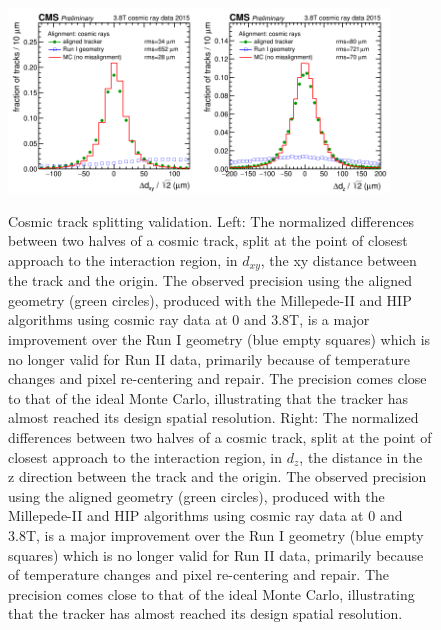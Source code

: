 \begin{figure}[htb]
    \begin{center}
        \includegraphics[width=0.45\textwidth]{../figs/Alignment/AlRes_CRAFT_hist_Delta_dxy.png}\includegraphics[width=0.45\textwidth]{../figs/Alignment/AlRes_CRAFT_hist_Delta_dz.png}
    \end{center}
    \caption{Cosmic track splitting validation. Left: The normalized differences between two halves of a cosmic track, split at the point of closest approach to the interaction region, in $d_{xy}$, the xy distance between the track and the origin. The observed precision using the aligned geometry (green circles), produced with the Millepede-II and HIP algorithms using cosmic ray data at 0 and 3.8T, is a major improvement over the Run I geometry (blue empty squares) which is no longer valid for Run II data, primarily because of temperature changes and pixel re-centering and repair. The precision comes close to that of the ideal Monte Carlo, illustrating that the tracker has almost reached its design spatial resolution. Right: The normalized differences between two halves of a cosmic track, split at the point of closest approach to the interaction region, in $d_z$, the distance in the z direction between the track and the origin. The observed precision using the aligned geometry (green circles), produced with the Millepede-II and HIP algorithms using cosmic ray data at 0 and 3.8T, is a major improvement over the Run I geometry (blue empty squares) which is no longer valid for Run II data, primarily because of temperature changes and pixel re-centering and repair. The precision comes close to that of the ideal Monte Carlo, illustrating that the tracker has almost reached its design spatial resolution. }
    \label{fig:trackSplit}
\end{figure}

